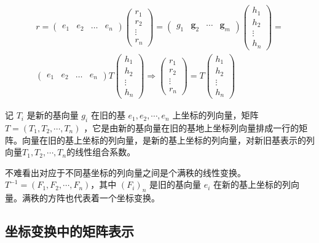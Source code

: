 \begin{gather*}
	{r}= \begin{pmatrix} {e_1} &{e_2}  &\dots  & {e_n}\end{pmatrix} \begin{pmatrix}r_1 \\ r_2 \\ \vdots \\r_n \end{pmatrix} = \begin{pmatrix}{g}_1 & \textbf{g}_2& \cdots &\textbf{g}_m \end{pmatrix}\begin{pmatrix}h_1 \\ h_2 \\ \vdots \\h_n \end{pmatrix}=\\
	\begin{pmatrix} {e_1} &{e_2}  &\dots  & {e_n}\end{pmatrix} T \begin{pmatrix} h_1 \\ h_2 \\ \vdots \\h_n \end{pmatrix} \Rightarrow \begin{pmatrix}r_1 \\ r_2 \\ \vdots \\r_n \end{pmatrix} = T\begin{pmatrix}h_1 \\ h_2 \\ \vdots \\h_n \end{pmatrix}
\end{gather*}

记 $ T_i $ 是新的基向量 $ g_i $ 在旧的基 $ {e_1,e_2,\cdots,e_n} $ 上坐标的列向量，矩阵 $ T=(T_1, T_2,\cdots,T_n) $ ，它是由新的基向量在旧的基地上坐标列向量排成一行的矩阵。向量在旧的基上坐标的列向量，是新的基上坐标的列向量，对新旧基表示的列向量$ {T_1, T_2,\cdots,T_n} $的线性组合系数。

不难看出对应于不同基坐标的列向量之间是个满秩的线性变换。$ T^{-1} = (F_1,F_2, \cdots, F_n) $，其中 $ (F_i)_n $ 是旧的基向量 $ e_i $ 在新的基上坐标的列向量。满秩的方阵也代表着一个坐标变换。


\subsection{坐标变换中的矩阵表示}

